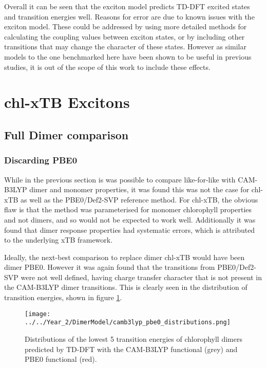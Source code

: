 Overall it can be seen that the exciton model predicts TD-DFT excited states and
transition energies well. Reasons for error are due to known issues with the exciton
model. These could be addressed by using more detailed methods for calculating the
coupling values between exciton states, or by including other transitions that may
change the character of these states. However as similar models to the one benchmarked
here have been shown to be useful in previous studies, it is out of the scope of 
this work to include these effects.

\afterpartskip
\section{chl-xTB Excitons}
\label{sec:chl_xTB_excitons}

\subsection{Full Dimer comparison}
\label{subsec:pbe0_and_chl_xtb_dimer}

\subsubsection{Discarding PBE0}
\label{subsec:state_assign}

While in the previous section is was possible to compare like-for-like with CAM-B3LYP
dimer and monomer properties, it was found this was not the case for chl-xTB as 
well as the PBE0/Def2-SVP reference method. For chl-xTB, the obvious flaw is that
the method was parameterised for monomer chlorophyll properties and not dimers, 
and so would not be expected to work well. Additionally it was found that dimer
response properties had systematic errors, which is attributed to the underlying
xTB framework.

Ideally, the next-best comparison to replace dimer chl-xTB would have been dimer
PBE0. However it was again found that the transitions from PBE0/Def2-SVP were not
well defined, having charge transfer character that is not present in the CAM-B3LYP
dimer transitions. This is clearly seen in the distribution of transition energies, 
shown in figure \ref{fig:camb3lyp_pbe0_distributions}.

\begin{figure}
    \centering
    \texttt{[image: ../../Year\_2/DimerModel/camb3lyp\_pbe0\_distributions.png]}
    \label{fig:camb3lyp_pbe0_distributions}
    \caption{Distributions of the lowest 5 transition energies of chlorophyll dimers 
    predicted by TD-DFT with the CAM-B3LYP functional (grey) and PBE0 functional (red).}
\end{figure}

